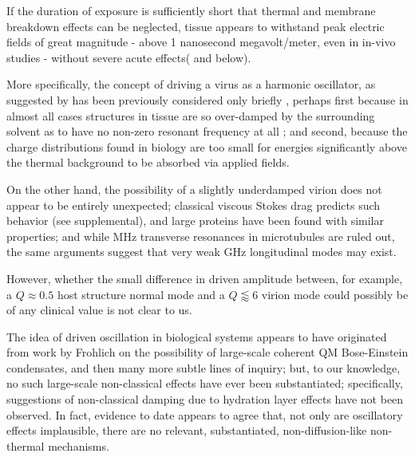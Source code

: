 \documentclass[paper.tex]{subfiles}
\begin{document}
\begin{multicols}{1}
If the duration of exposure is sufficiently short that thermal and membrane breakdown effects can be neglected, tissue appears to withstand peak electric fields of great magnitude - above 1 nanosecond megavolt/meter, even in in-vivo studies - without severe acute effects(\cite{Repeated2020}\cite{Review2011} and below).

More specifically, the concept of driving a virus as a harmonic oscillator, as suggested by \cite{Efficient2015} has been previously considered only briefly \cite{MECHANICAL1968}\cite{Comment2004}\cite{Vibrational2009}\cite{Maximum2010}, perhaps first because in almost all cases structures in tissue are so over-damped by the surrounding solvent\cite{Vibrational2002}\cite{Biological2002}\cite{Biophysics2000}\cite{Viscous2000} as to have no non-zero resonant frequency at all \cite{dielectric1996}\cite{gabriel1996compilation}; and second, because the charge distributions found in biology are too small for energies significantly above the thermal background to be absorbed via applied fields. 

On the other hand, the possibility of a slightly underdamped virion does not appear to be entirely unexpected; classical viscous Stokes drag predicts such behavior\cite{nature1986} (see supplemental), and large proteins have been found with similar properties\cite{Microwave1994}; and while MHz transverse resonances in microtubules are ruled out\cite{Viscous2000}, the same arguments suggest that very weak GHz longitudinal modes may exist.

However, whether the small difference in driven amplitude between, for example, a $Q\approx0.5$ host structure normal mode and a $Q\lessapprox6$ virion mode could possibly be of any clinical value is not clear to us.

%

The idea of driven oscillation in biological systems appears to have originated from work by Frohlich\cite{Longrange1968}\cite{Evidence1983}\cite{Biological1980}\cite{Coherence1983} on the possibility of large-scale coherent QM Bose-Einstein condensates, and then many more subtle lines of inquiry\cite{Mechanisms1992}\cite{mechanisms1981}; but, to our knowledge, no such large-scale non-classical effects have ever been substantiated; specifically, suggestions of non-classical damping due to hydration layer effects have not been observed. In fact, evidence to date\cite{Exposure2009}\cite{ICNIRP2020}\cite{C95} appears to agree that, not only are oscillatory effects implausible, there are no relevant, substantiated, non-diffusion-like non-thermal mechanisms. 


\end{multicols}
\end{document}
